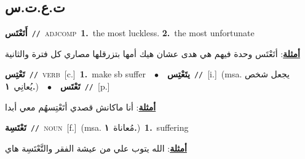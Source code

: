 \documentclass[10pt,a4paper,twoside]{article} %
\begin{document}
\begin{multicols}{2}
{{{{{{{{{{{\vspace{-3mm}
\subsection*{\color{blue}\foreignlanguage{arabic}{ت.ع.ت.س}\color{blue}{}} 

{\setlength\topsep{0pt}\textbf{\foreignlanguage{arabic}{أَتَعْتَس}}\ {\color{gray}\texttt{//}\color{black}}\ \textsc{adj\textunderscore comp}\ \textbf{1.}~the most luckless.  \textbf{2.}~the most unfortunate\  \begin{flushright}\color{gray}\foreignlanguage{arabic}{\textbf{\underline{\foreignlanguage{arabic}{أمثلة}}}: أتَعْتَس وحدة فيهم هي هدى عشان هيك أمها بتزرقلها مصاري كل فترة والثانية}\end{flushright}\color{black}} \vspace{2mm}

{\setlength\topsep{0pt}\textbf{\foreignlanguage{arabic}{تَعْتِس}}\ {\color{gray}\texttt{//}\color{black}}\ \textsc{verb}\ [c.]\ \textbf{1.}~make sb suffer\ \ $\bullet$\ \ \setlength\topsep{0pt}\textbf{\foreignlanguage{arabic}{يتَعْتِس}}\ {\color{gray}\texttt{//}\color{black}}\ [i.]\ \color{gray}(msa. \foreignlanguage{arabic}{يجعل شخص يُعانِي}~\foreignlanguage{arabic}{\textbf{١.}})\color{black}\ \ $\bullet$\ \ \setlength\topsep{0pt}\textbf{\foreignlanguage{arabic}{تَعْتَس}}\ {\color{gray}\texttt{//}\color{black}}\ [p.]\  \begin{flushright}\color{gray}\foreignlanguage{arabic}{\textbf{\underline{\foreignlanguage{arabic}{أمثلة}}}: أنا ماكانش قصدي أتَعْتِسهُم معي أبدا}\end{flushright}\color{black}} \vspace{2mm}

{\setlength\topsep{0pt}\textbf{\foreignlanguage{arabic}{تَعْتَسِة}}\ {\color{gray}\texttt{//}\color{black}}\ \textsc{noun}\ [f.]\ \color{gray}(msa. \foreignlanguage{arabic}{مُعاناة}~\foreignlanguage{arabic}{\textbf{١.}})\color{black}\ \textbf{1.}~suffering\  \begin{flushright}\color{gray}\foreignlanguage{arabic}{\textbf{\underline{\foreignlanguage{arabic}{أمثلة}}}: الله يتوب علي من عيشة الفقر والتَّعْتَسِة هاي}\end{flushright}\color{black}} \vspace{2mm}

}}}}}}}}}}}
\end{multicols}
\end{document}
